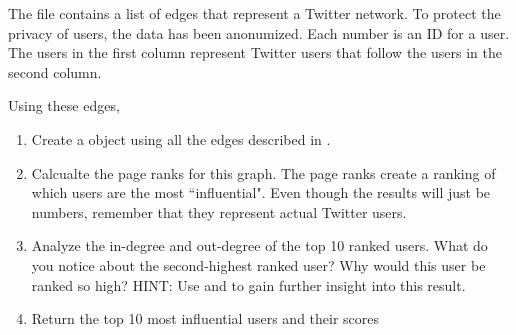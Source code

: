 \begin{problem}
The  file contains a list of edges that represent a Twitter network. To protect the privacy of users, the data has been anonumized. Each number is an ID for a user. The users in the first column represent Twitter users that follow the users in the second column.

Using these edges,
\begin{enumerate}
\item Create a  object using all the edges described in .
\item Calcualte the page ranks for this graph. The page ranks create a ranking of which users are the most ``influential". Even though the results will just be numbers, remember that they represent actual Twitter users.
\item Analyze the in-degree and out-degree of the top 10 ranked users. What do you notice about the second-highest ranked user? Why would this user be ranked so high? HINT: Use  and  to gain further insight into this result.
\item Return the top 10 most influential users and their scores
\end{enumerate}
\end{problem}
